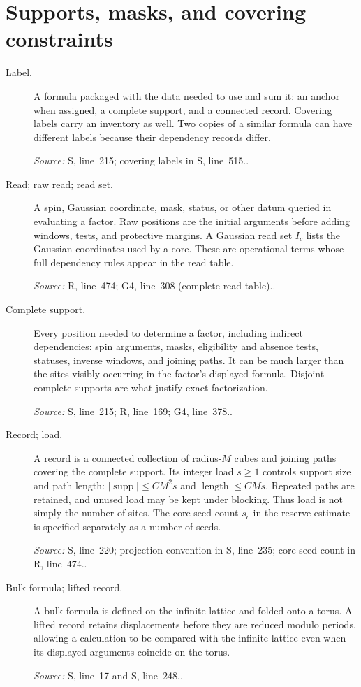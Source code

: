 \documentclass[11pt]{article}
\newcommand{\src}[2]{\textsf{#1}, line~#2}
\newcommand{\where}[1]{\par{\small\textit{Source:} #1.}}
\begin{document}
\section*{Supports, masks, and covering constraints}
\begin{description}
\item[Label.]
A formula packaged with the data needed to use and sum it: an anchor
when assigned, a complete support, and a connected record.  Covering
labels carry an inventory as well.  Two copies of a similar formula
can have different labels because their dependency records differ.
\where{\src{S}{215}; covering labels in \src{S}{515}.}

\item[Read; raw read; read set.]
A spin, Gaussian coordinate, mask, status, or other datum queried in
evaluating a factor.  Raw positions are the initial arguments before
adding windows, tests, and protective margins.  A Gaussian read set
\(I_c\) lists the Gaussian coordinates used by a core.  These are
operational terms whose full dependency rules appear in the read table.
\where{\src{R}{474}; \src{G4}{308} (complete-read table).}

\item[Complete support.]
Every position needed to determine a factor, including indirect
dependencies: spin arguments, masks, eligibility and absence tests,
statuses, inverse windows, and joining paths.  It can be much larger
than the sites visibly occurring in the factor's displayed formula.
Disjoint complete supports are what justify exact factorization.
\where{\src{S}{215}; \src{R}{169}; \src{G4}{378}.}

\item[Record; load.]
A record is a connected collection of radius-\(M\) cubes and joining
paths covering the complete support.  Its integer load \(s\ge1\)
controls support size and path length:
\(|\operatorname{supp}|\le CM^2s\) and
\(\operatorname{length}\le CMs\).  Repeated paths are retained, and
unused load may be kept under blocking.  Thus load is not simply the
number of sites.  The core seed count \(s_c\) in the reserve estimate
is specified separately as a number of seeds.
\where{\src{S}{220}; projection convention in \src{S}{235};
core seed count in \src{R}{474}.}

\item[Bulk formula; lifted record.]
A bulk formula is defined on the infinite lattice and folded onto a
torus.  A lifted record retains displacements before they are reduced
modulo periods, allowing a calculation to be compared with the infinite
lattice even when its displayed arguments coincide on the torus.
\where{\src{S}{17} and \src{S}{248}.}


\end{description}
\end{document}

